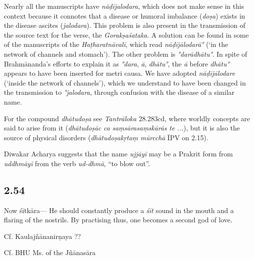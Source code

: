 \begin{ekdosis}
\begin{philcomm}[hp02_053]
Nearly all the manuscripts have \emph{nāḍījalodara}, which does not make sense in this context because it connotes that a disease or humoral imbalance (\emph{doṣa}) exists in the disease ascites (\emph{jalodara}). This problem is also present in the transmission of the source text for the verse, the \emph{Gorakṣaśataka}. A solution can be found in some of the manuscripts of the \emph{Haṭharatnāvalī}, which read \emph{nāḍījālodarā°} (‘in the network of channels and stomach’). The other problem is \emph{°darādhātu°}. In spite of Brahmānanda’s efforts to explain it as \emph{°dara}, \emph{ā}, \emph{dhātu°}, the \emph{ā} before \emph{dhātu°} appears to have been inserted for metri causa. We have adopted \emph{nāḍījālodare} (‘inside the network of channels’), which we understand to have been changed in the transmission to \emph{°jalodara}, through confusion with the disease of a similar name.

For the compound \emph{dhātudoṣa} see \emph{Tantrāloka} 28.283cd, where worldly concepts are said to arise from it (\emph{dhātudoṣāc ca saṃsārasaṃskārās te ...}), but it is also the source of physical disorders (\emph{dhātudoṣakṛtaṃ mūrcchā} ĪPV on 2.15).

Diwakar Acharya suggests that the name \emph{ujjāyī} may be a Prakrit form from \emph{uddhmāyī} from the verb \emph{ud-dhmā}, “to blow out”.

\end{philcomm}

\subsection*{2.54}
\begin{translation}[hp02_054]
Now śītkāra---
He should constantly produce a \emph{śīt} sound in the mouth and a flaring of the nostrils. By practising thus, one becomes a second god of love.
\end{translation}

\begin{sources}[hp02_054]
Cf. Kaulajñānanirṇaya ??

\begin{versinnote}
\end{versinnote}

Cf. BHU Ms. of the Jñānasāra


\end{sources}
\end{ekdosis}
